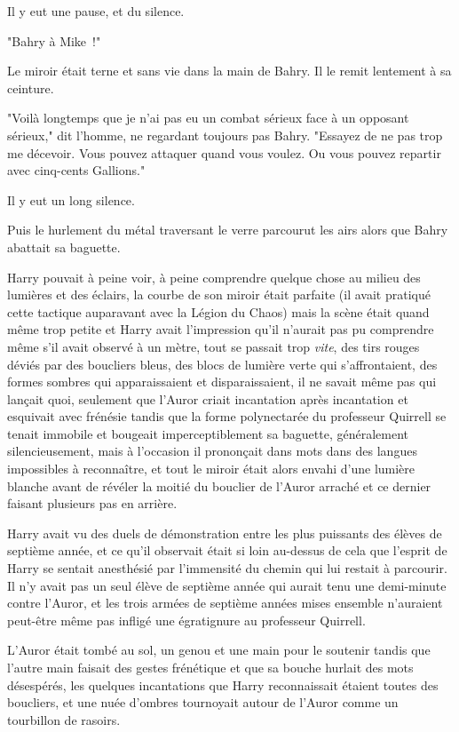Il y eut une pause, et du silence.

"Bahry à Mike~!"

Le miroir était terne et sans vie dans la main de Bahry. Il le remit lentement à sa ceinture.

"Voilà longtemps que je n'ai pas eu un combat sérieux face à un opposant sérieux," dit l'homme, ne regardant toujours pas Bahry. "Essayez de ne pas trop me décevoir. Vous pouvez attaquer quand vous voulez. Ou vous pouvez repartir avec cinq-cents Gallions."

Il y eut un long silence.

Puis le hurlement du métal traversant le verre parcourut les airs alors que Bahry abattait sa baguette.

\later

Harry pouvait à peine voir, à peine comprendre quelque chose au milieu des lumières et des éclairs, la courbe de son miroir était parfaite (il avait pratiqué cette tactique auparavant avec la Légion du Chaos) mais la scène était quand même trop petite et Harry avait l'impression qu'il n'aurait pas pu comprendre même s'il avait observé à un mètre, tout se passait trop \emph{vite}, des tirs rouges déviés par des boucliers bleus, des blocs de lumière verte qui s'affrontaient, des formes sombres qui apparaissaient et disparaissaient, il ne savait même pas qui lançait quoi, seulement que l'Auror criait incantation après incantation et esquivait avec frénésie tandis que la forme polynectarée du professeur Quirrell se tenait immobile et bougeait imperceptiblement sa baguette, généralement silencieusement, mais à l'occasion il prononçait dans mots dans des langues impossibles à reconnaître, et tout le miroir était alors envahi d'une lumière blanche avant de révéler la moitié du bouclier de l'Auror arraché et ce dernier faisant plusieurs pas en arrière.

Harry avait vu des duels de démonstration entre les plus puissants des élèves de septième année, et ce qu'il observait était si loin au-dessus de cela que l'esprit de Harry se sentait anesthésié par l'immensité du chemin qui lui restait à parcourir. Il n'y avait pas un seul élève de septième année qui aurait tenu une demi-minute contre l'Auror, et les trois armées de septième années mises ensemble n'auraient peut-être même pas infligé une égratignure au professeur Quirrell.

L'Auror était tombé au sol, un genou et une main pour le soutenir tandis que l'autre main faisait des gestes frénétique et que sa bouche hurlait des mots désespérés, les quelques incantations que Harry reconnaissait étaient toutes des boucliers, et une nuée d'ombres tournoyait autour de l'Auror comme un tourbillon de rasoirs.

